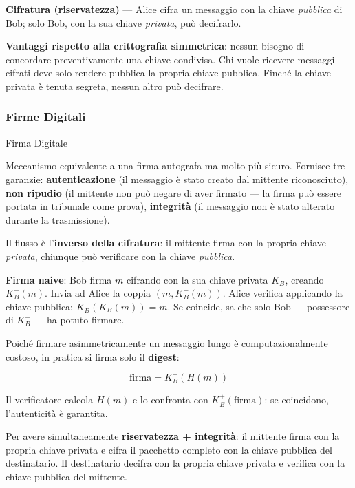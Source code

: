 \documentclass[
  italian,
  openany]{book}
\begin{document}
\textbf{Cifratura (riservatezza)} --- Alice cifra un messaggio con la
chiave \emph{pubblica} di Bob; solo Bob, con la sua chiave
\emph{privata}, può decifrarlo.

\textbf{Vantaggi rispetto alla crittografia simmetrica}: nessun bisogno
di concordare preventivamente una chiave condivisa. Chi vuole ricevere
messaggi cifrati deve solo rendere pubblica la propria chiave pubblica.
Finché la chiave privata è tenuta segreta, nessun altro può decifrare.

\subsubsection{Firme Digitali}\label{firme-digitali}

\begin{calloutdefinition}{Firma Digitale}

Meccanismo equivalente a una firma autografa ma molto più sicuro.
Fornisce tre garanzie: \textbf{autenticazione} (il messaggio è stato
creato dal mittente riconosciuto), \textbf{non ripudio} (il mittente non
può negare di aver firmato --- la firma può essere portata in tribunale
come prova), \textbf{integrità} (il messaggio non è stato alterato
durante la trasmissione).

\end{calloutdefinition}

Il flusso è l'\textbf{inverso della cifratura}: il mittente firma con la
propria chiave \emph{privata}, chiunque può verificare con la chiave
\emph{pubblica}.

\textbf{Firma naive}: Bob firma \(m\) cifrando con la sua chiave privata
\(K^-_B\), creando \(K^-_B(m)\). Invia ad Alice la coppia
\((m, K^-_B(m))\). Alice verifica applicando la chiave pubblica:
\(K^+_B(K^-_B(m)) = m\). Se coincide, sa che solo Bob --- possessore di
\(K^-_B\) --- ha potuto firmare.

Poiché firmare asimmetricamente un messaggio lungo è computazionalmente
costoso, in pratica si firma solo il \textbf{digest}:

\[\text{firma} = K^-_B(H(m))\]

Il verificatore calcola \(H(m)\) e lo confronta con
\(K^+_B(\text{firma})\): se coincidono, l'autenticità è garantita.

Per avere simultaneamente \textbf{riservatezza + integrità}: il mittente
firma con la propria chiave privata e cifra il pacchetto completo con la
chiave pubblica del destinatario. Il destinatario decifra con la propria
chiave privata e verifica con la chiave pubblica del mittente.
\end{document}
